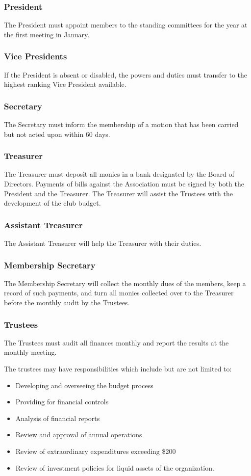 \documentclass[12pt,letterpaper]{article}
\begin{document}
\subsubsection{President}
The President must appoint members to the standing committees for the year at the first meeting in January. 

\subsubsection{Vice Presidents}
If the President is absent or disabled, the powers and duties must transfer to the highest ranking Vice President available.

\subsubsection{Secretary}
The Secretary must inform the membership of a motion that has been carried but not acted upon within 60 days.

\subsubsection{Treasurer}
The Treasurer must deposit all monies in a bank designated by the Board of Directors. Payments of bills against the Association must be signed by both the President and the Treasurer. The Treasurer will assist the Trustees with the development of the club budget. 

\subsubsection{Assistant Treasurer}
The Assistant Treasurer will help the Treasurer with their duties.

\subsubsection{Membership Secretary}
The Membership Secretary will collect the monthly dues of the members, keep a record of such payments, and turn all monies collected over to the Treasurer before the monthly audit by the Trustees.

\subsubsection{Trustees}
The Trustees must audit all finances monthly and report the results at the monthly meeting.

The trustees may have responsibilities which include but are not limited to:
\begin{itemize}
\item Developing and overseeing the budget process
\item Providing for financial controls
\item Analysis of financial reports
\item Review and approval of annual operations
\item Review of extraordinary expenditures exceeding \$200
\item Review of investment policies for liquid assets of the organization.
\end{itemize}
\end{document}
